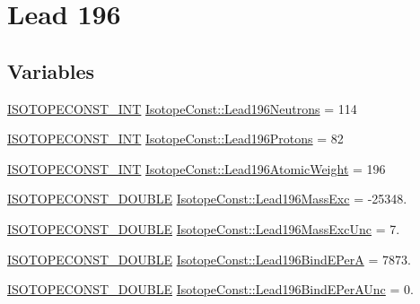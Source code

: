 \hypertarget{group___isotope_const-_lead-_pb196}{}\section{Lead 196}
\label{group___isotope_const-_lead-_pb196}
\subsection*{Variables}
\begin{DoxyCompactItemize}
\item 
\mbox{\hyperlink{group___isotope_const-_macros_ga5f18360b3e99483a35c32d789e62621c}{I\+S\+O\+T\+O\+P\+E\+C\+O\+N\+S\+T\+\_\+\+I\+NT}} \mbox{\hyperlink{group___isotope_const-_lead-_pb196_ga68f2f3db05ceefa40b5134aea4754cab}{Isotope\+Const\+::\+Lead196\+Neutrons}} = 114
\item 
\mbox{\hyperlink{group___isotope_const-_macros_ga5f18360b3e99483a35c32d789e62621c}{I\+S\+O\+T\+O\+P\+E\+C\+O\+N\+S\+T\+\_\+\+I\+NT}} \mbox{\hyperlink{group___isotope_const-_lead-_pb196_ga2fae4b5e7a853d23e4fc4617240c76b9}{Isotope\+Const\+::\+Lead196\+Protons}} = 82
\item 
\mbox{\hyperlink{group___isotope_const-_macros_ga5f18360b3e99483a35c32d789e62621c}{I\+S\+O\+T\+O\+P\+E\+C\+O\+N\+S\+T\+\_\+\+I\+NT}} \mbox{\hyperlink{group___isotope_const-_lead-_pb196_ga0564653cdb4b51acf664f7c7c54a17eb}{Isotope\+Const\+::\+Lead196\+Atomic\+Weight}} = 196
\item 
\mbox{\hyperlink{group___isotope_const-_macros_ga8f45a7272ce02c0b4c65c44636ed719a}{I\+S\+O\+T\+O\+P\+E\+C\+O\+N\+S\+T\+\_\+\+D\+O\+U\+B\+LE}} \mbox{\hyperlink{group___isotope_const-_lead-_pb196_ga810b2b335338f0df3ed9de170e25f18a}{Isotope\+Const\+::\+Lead196\+Mass\+Exc}} = -\/25348.
\item 
\mbox{\hyperlink{group___isotope_const-_macros_ga8f45a7272ce02c0b4c65c44636ed719a}{I\+S\+O\+T\+O\+P\+E\+C\+O\+N\+S\+T\+\_\+\+D\+O\+U\+B\+LE}} \mbox{\hyperlink{group___isotope_const-_lead-_pb196_gaf8f5f4f2b8bee8f2eeaa684cc670f2a0}{Isotope\+Const\+::\+Lead196\+Mass\+Exc\+Unc}} = 7.
\item 
\mbox{\hyperlink{group___isotope_const-_macros_ga8f45a7272ce02c0b4c65c44636ed719a}{I\+S\+O\+T\+O\+P\+E\+C\+O\+N\+S\+T\+\_\+\+D\+O\+U\+B\+LE}} \mbox{\hyperlink{group___isotope_const-_lead-_pb196_ga254f7c802b865834d9b2b415e7891dbf}{Isotope\+Const\+::\+Lead196\+Bind\+E\+PerA}} = 7873.
\item 
\mbox{\hyperlink{group___isotope_const-_macros_ga8f45a7272ce02c0b4c65c44636ed719a}{I\+S\+O\+T\+O\+P\+E\+C\+O\+N\+S\+T\+\_\+\+D\+O\+U\+B\+LE}} \mbox{\hyperlink{group___isotope_const-_lead-_pb196_ga12900482a016aec83d8324329496eb39}{Isotope\+Const\+::\+Lead196\+Bind\+E\+Per\+A\+Unc}} = 0.

\end{DoxyCompactItemize}
